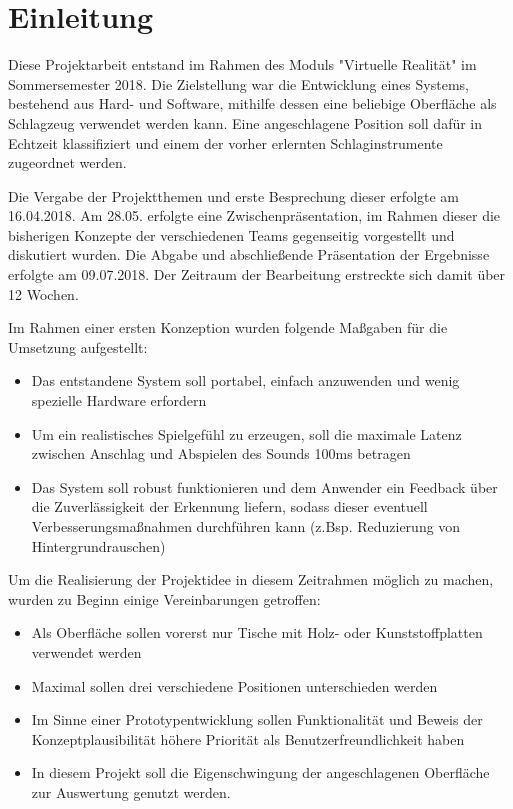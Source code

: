 \section*{Einleitung}
Diese Projektarbeit entstand im Rahmen des Moduls "Virtuelle Realität" im Sommersemester 2018. 
Die Zielstellung war die Entwicklung eines Systems, bestehend aus Hard- und Software, mithilfe dessen eine beliebige Oberfläche als Schlagzeug verwendet werden kann.
Eine angeschlagene Position soll dafür in Echtzeit klassifiziert und einem der vorher erlernten Schlaginstrumente zugeordnet werden.

Die Vergabe der Projektthemen und erste Besprechung dieser erfolgte am 16.04.2018. Am 28.05. erfolgte eine Zwischenpräsentation, im Rahmen dieser die bisherigen Konzepte der verschiedenen Teams gegenseitig vorgestellt und diskutiert wurden. 
Die Abgabe und abschließende Präsentation der Ergebnisse erfolgte am 09.07.2018. 
Der Zeitraum der Bearbeitung erstreckte sich damit über 12 Wochen.

Im Rahmen einer ersten Konzeption wurden folgende Maßgaben für die Umsetzung aufgestellt:
\begin{itemize}
	\item Das entstandene System soll portabel, einfach anzuwenden und wenig spezielle Hardware erfordern
	\item Um ein realistisches Spielgefühl zu erzeugen, soll die maximale Latenz zwischen Anschlag und Abspielen des Sounds 100ms betragen
	\item Das System soll robust funktionieren und dem Anwender ein Feedback über die Zuverlässigkeit der Erkennung liefern, sodass dieser eventuell Verbesserungsmaßnahmen durchführen kann (z.Bsp. Reduzierung von Hintergrundrauschen)
\end{itemize}

Um die Realisierung der Projektidee in diesem Zeitrahmen möglich zu machen, wurden zu Beginn einige Vereinbarungen getroffen:
\begin{itemize}
	\item Als Oberfläche sollen vorerst nur Tische mit Holz- oder Kunststoffplatten verwendet werden
	\item Maximal sollen drei verschiedene Positionen unterschieden werden
	\item Im Sinne einer Prototypentwicklung sollen Funktionalität und Beweis der Konzeptplausibilität höhere Priorität als Benutzerfreundlichkeit haben
    \item In diesem Projekt soll die Eigenschwingung der angeschlagenen Oberfläche zur Auswertung genutzt werden. 
\end{itemize}


